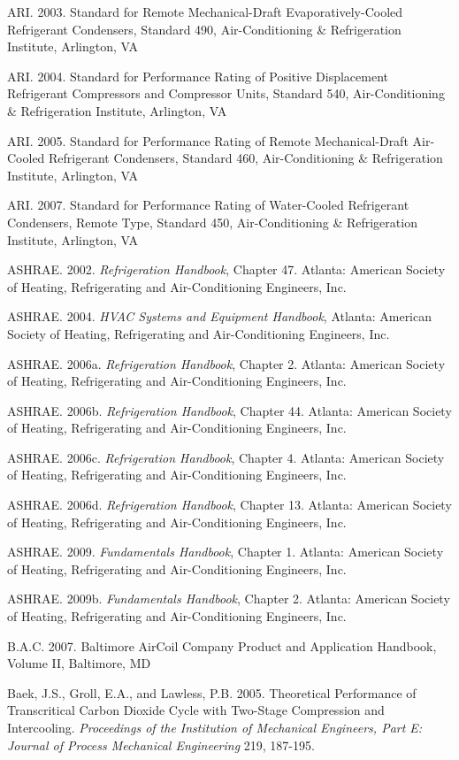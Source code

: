 ARI. 2003. Standard for Remote Mechanical-Draft Evaporatively-Cooled Refrigerant Condensers, Standard 490, Air-Conditioning \& Refrigeration Institute, Arlington, VA

ARI. 2004. Standard for Performance Rating of Positive Displacement Refrigerant Compressors and Compressor Units, Standard 540, Air-Conditioning \& Refrigeration Institute, Arlington, VA

ARI. 2005. Standard for Performance Rating of Remote Mechanical-Draft Air-Cooled Refrigerant Condensers, Standard 460, Air-Conditioning \& Refrigeration Institute, Arlington, VA

ARI. 2007. Standard for Performance Rating of Water-Cooled Refrigerant Condensers, Remote Type, Standard 450, Air-Conditioning \& Refrigeration Institute, Arlington, VA

ASHRAE. 2002. \emph{Refrigeration Handbook}, Chapter 47. Atlanta: American Society of Heating, Refrigerating and Air-Conditioning Engineers, Inc.

ASHRAE. 2004. \emph{HVAC Systems and Equipment Handbook}, Atlanta: American Society of Heating, Refrigerating and Air-Conditioning Engineers, Inc.

ASHRAE. 2006a. \emph{Refrigeration Handbook}, Chapter 2. Atlanta: American Society of Heating, Refrigerating and Air-Conditioning Engineers, Inc.

ASHRAE. 2006b. \emph{Refrigeration Handbook}, Chapter 44. Atlanta: American Society of Heating, Refrigerating and Air-Conditioning Engineers, Inc.

ASHRAE. 2006c. \emph{Refrigeration Handbook}, Chapter 4. Atlanta: American Society of Heating, Refrigerating and Air-Conditioning Engineers, Inc.

ASHRAE. 2006d. \emph{Refrigeration Handbook}, Chapter 13. Atlanta: American Society of Heating, Refrigerating and Air-Conditioning Engineers, Inc.

ASHRAE. 2009. \emph{Fundamentals Handbook}, Chapter 1. Atlanta: American Society of Heating, Refrigerating and Air-Conditioning Engineers, Inc.

ASHRAE. 2009b. \emph{Fundamentals Handbook}, Chapter 2. Atlanta: American Society of Heating, Refrigerating and Air-Conditioning Engineers, Inc.

B.A.C. 2007. Baltimore AirCoil Company Product and Application Handbook, Volume II, Baltimore, MD

Baek, J.S., Groll, E.A., and Lawless, P.B. 2005. Theoretical Performance of Transcritical Carbon Dioxide Cycle with Two-Stage Compression and Intercooling. \emph{Proceedings of the Institution of Mechanical Engineers, Part E: Journal of Process Mechanical Engineering} 219, 187-195.

